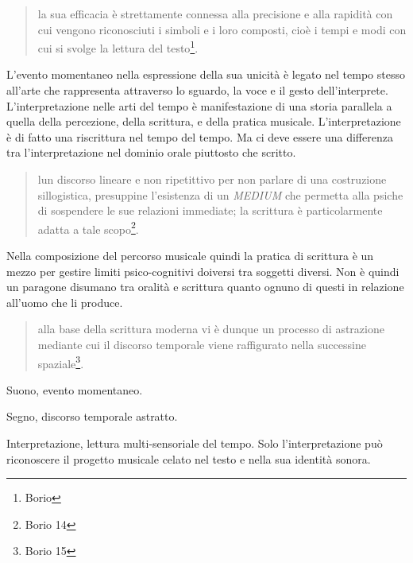 \begin{quote}
	la sua efficacia è strettamente connessa alla precisione e alla rapidità con
	cui vengono riconosciuti i simboli e i loro composti, cioè i tempi e modi con
	cui si svolge la lettura del testo\footnote{Borio}.
\end{quote}

L'evento momentaneo nella espressione della sua unicità è legato nel tempo stesso
all'arte che rappresenta attraverso lo sguardo, la voce e il gesto dell'interprete.
L'interpretazione nelle arti del tempo è manifestazione di una storia parallela
a quella della percezione, della scrittura, e della pratica musicale.
L'interpretazione è di fatto una riscrittura nel tempo del tempo. Ma ci deve
essere una differenza tra l'interpretazione nel dominio orale piuttosto che scritto.

\begin{quote}
	lun discorso lineare e non ripetittivo per non parlare di una costruzione
	sillogistica, presuppine l'esistenza di un \emph{MEDIUM} che permetta alla
	psiche di sospendere le sue relazioni immediate; la scrittura è particolarmente
	adatta a tale scopo\footnote{Borio 14}.
\end{quote}

Nella composizione del percorso musicale quindi la pratica di scrittura è un
mezzo per gestire limiti psico-cognitivi doiversi tra soggetti diversi. Non è
quindi un paragone disumano tra oralità e scrittura quanto ognuno di questi in
relazione all'uomo che li produce.

\begin{quote}
	alla base della scrittura moderna vi è dunque un processo di astrazione
	mediante cui il discorso temporale viene raffigurato nella successine
	spaziale\footnote{Borio 15}.
\end{quote}

Suono, evento momentaneo.

Segno, discorso temporale astratto.

Interpretazione, lettura multi-sensoriale del tempo. Solo l'interpretazione può
riconoscere il progetto musicale celato nel testo e nella sua identità sonora.

\begin{center}
\end{center}

